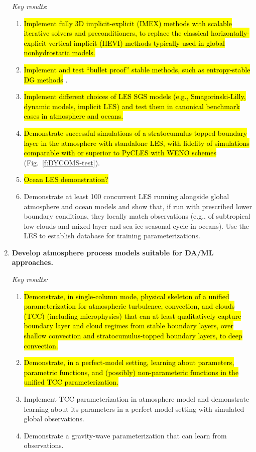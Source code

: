 \documentclass{article}
\newcommand{\hlg}[1]{{\sethlcolor{green}\hl{#1}}}
\begin{document}
\begin{enumerate}
    \emph{Key results}:
    \begin{enumerate}
        \item \hlg{Implement fully 3D implicit-explicit (IMEX) methods with scalable iterative solvers and preconditioners, to replace the classical horizontally-explicit-vertical-implicit (HEVI) methods typically used in global nonhydrostatic models.}
        \item \hlg{Implement and test ``bullet proof'' stable methods, such as entropy-stable DG methods} \citep[e.g.,][]{Chan18a}.
        \item \hlg{Implement different choices of LES SGS models (e.g., Smagorinski-Lilly, dynamic models, implicit LES) and test them in canonical benchmark cases in atmosphere and oceans.}
        \item \hlg{Demonstrate successful simulations of a stratocumulus-topped boundary layer in the atmosphere with standalone LES, with fidelity of simulations comparable with or superior to PyCLES with WENO schemes} (Fig.~\ref{f:DYCOMS-test}). 
        \item \hl{Ocean LES demonstration?}
        \item Demonstrate at least 100 concurrent LES running alongside global atmosphere and ocean models and show that, if run with prescribed lower boundary conditions, they locally match observations (e.g., of subtropical low clouds and mixed-layer and sea ice seasonal cycle in oceans). Use the LES to establish database for training parameterizations.
    \end{enumerate}
   
    \item \textbf{Develop atmosphere process models suitable for DA/ML approaches.}
    
    \emph{Key results:}
    \begin{enumerate}
        \item \hlg{Demonstrate, in single-column mode, physical skeleton of a unified parameterization for atmospheric turbulence, convection, and clouds (TCC) (including microphysics) that can at least qualitatively capture boundary layer and cloud regimes from stable boundary layers, over shallow convection and stratocumulus-topped boundary layers, to deep convection.}
        \item \hlg{Demonstrate, in a perfect-model setting, learning about parameters, parametric functions, and (possibly) non-parameteric functions in the unified TCC parameterization.}
        \item Implement TCC parameterization in atmosphere model and demonstrate learning about its parameters in a perfect-model setting with simulated global observations.
        \item Demonstrate a gravity-wave parameterization that can learn from observations.
    \end{enumerate}
    

\end{enumerate}
\end{document}
